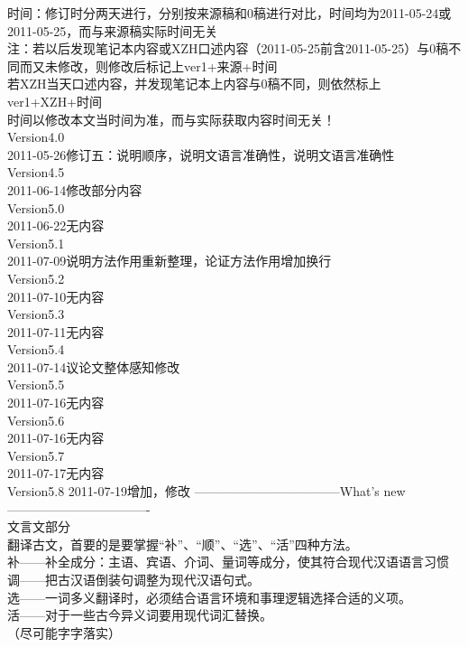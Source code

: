 时间：修订时分两天进行，分别按来源稿和0稿进行对比，时间均为2011-05-24或2011-05-25，而与来源稿实际时间无关\\
注：若以后发现笔记本内容或XZH口述内容（2011-05-25前含2011-05-25）与0稿不同而又未修改，则修改后标记上ver1+来源+时间\\
若XZH当天口述内容，并发现笔记本上内容与0稿不同，则依然标上ver1+XZH+时间\\
时间以修改本文当时间为准，而与实际获取内容时间无关！\\
Version4.0\\
2011-05-26修订五：说明顺序，说明文语言准确性，说明文语言准确性\\
Version4.5\\
2011-06-14修改部分内容\\%
Version5.0\\
2011-06-22无内容\\%
Version5.1\\
2011-07-09说明方法作用重新整理，论证方法作用增加换行\\
Version5.2\\
2011-07-10无内容\\%
Version5.3\\
2011-07-11无内容\\%
Version5.4\\
2011-07-14议论文整体感知修改\\
Version5.5\\
2011-07-16无内容\\%
Version5.6\\
2011-07-16无内容\\%
Version5.7\\
2011-07-17无内容\\%
Version5.8
2011-07-19增加，修改
-----------------------------------What's new----------------------------------\\
文言文部分\\
翻译古文，首要的是要掌握“补”、“顺”、“选”、“活”四种方法。\\
补——补全成分：主语、宾语、介词、量词等成分，使其符合现代汉语语言习惯\\
调——把古汉语倒装句调整为现代汉语句式。\\
选——一词多义翻译时，必须结合语言环境和事理逻辑选择合适的义项。\\
活——对于一些古今异义词要用现代词汇替换。\\
（尽可能字字落实）
\\

